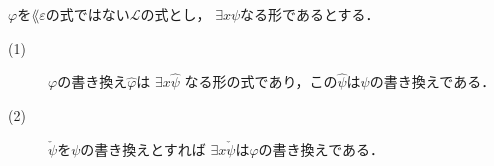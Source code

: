 	\begin{screen}
		\begin{metathm}[部分式の書き換えとの関係3]
		\label{metathm:relation_to_subformula_rewriting_3}
			$\varphi$を$\lang{\varepsilon}$の式ではない$\mathcal{L}$の式とし，
			$\exists x \psi$なる形であるとする．
			\begin{description}
				\item[(1)] $\varphi$の書き換え$\widehat{\varphi}$は
					$\exists x \widehat{\psi}$
					なる形の式であり，この$\widehat{\psi}$は$\psi$の書き換えである．
			
				\item[(2)] $\check{\psi}$を$\psi$の書き換えとすれば
					$\exists x \check{\psi}$は$\varphi$の書き換えである．
			\end{description}
		\end{metathm}
	\end{screen}
	

